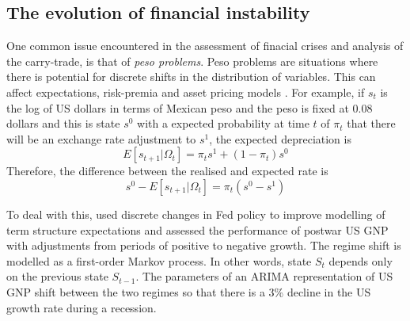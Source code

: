 \documentclass[12pt, a4paper, oneside]{article} %
\begin{document}

\subsection{The evolution of financial instability}
One common issue encountered in the assessment of finacial crises and analysis of the carry-trade, is that of \emph{peso problems}. Peso problems are situations where there is  potential for discrete shifts in the distribution of variables.  This can affect expectations, risk-premia and asset pricing models \citet{evans199621}.  For example, if $s_t$ is the log of US dollars in terms of Mexican peso and the peso is fixed at 0.08 dollars and this is state $s^0$ with a expected probability at time $t$ of $\pi_t$ that there will be an exchange rate adjustment to $s^1$, the expected depreciation is 
\begin{equation}
E[s_{t+1}|\Omega_t] = \pi_ts^1 + (1 - \pi_t)s^0
\end{equation}
Therefore, the difference between the realised and expected rate is 
\begin{equation}
s^0 - E[s_{t+1}|\Omega_t] = \pi_t(s^0 - s^1)
\end{equation}


To deal with this, \citet{hamilton1988rational, Hamilton1989} used discrete changes in Fed policy to improve modelling of term structure expectations and assessed the performance of postwar US GNP with adjustments from periods of positive to negative growth. The regime shift is modelled as a first-order Markov process.  In other words, state $S_t$ depends only on the previous state $S_{t-1}$.  The parameters of an ARIMA representation of US GNP shift between the two regimes so that there is a 3\% decline in the US growth rate during a recession.  
\end{document}
